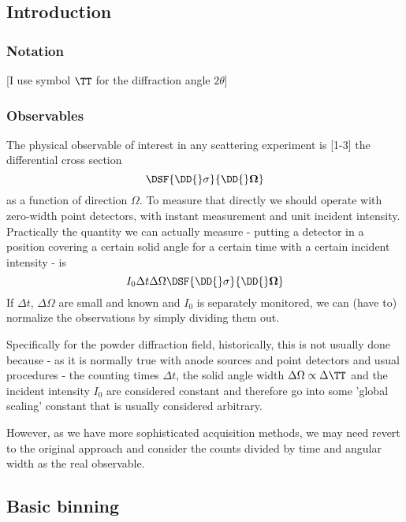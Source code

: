 

\subsection{Introduction}
\subsubsection{Notation}

[I use symbol $\TT$ for the diffraction angle $2\theta$]

\subsubsection{Observables}
The physical observable of interest in any scattering experiment is [1-3] the differential cross section
\[
\DSF{\DD{}\bf{\sigma}}{\DD{}\Omega}
\]
as a function of direction $\Omega$. 
To measure that directly we should operate with zero-width point detectors, with instant measurement and unit incident intensity. 
Practically 
the quantity we can actually measure - putting a detector in a position covering a certain 
solid angle for a certain time with a certain incident intensity - is
\[
{I_0}\Delta t \Delta\Omega\DSF{\DD{}\bf{\sigma}}{\DD{}\Omega}
\]
If $\Delta t$, $\Delta\Omega$ are small and known and $I_0$ is separately monitored, 
we can (have to) normalize the observations by simply dividing them out. 

Specifically for the powder diffraction field, historically, this is not usually done because
- as it is normally true with anode sources and point detectors and usual procedures - 
the counting times $\Delta t$, the solid angle width $\Delta\Omega\propto \Delta \TT$ 
and the incident intensity $I_0$ are considered 
constant and therefore go into some 'global scaling' constant that is usually considered arbitrary. 

However, as we have more sophisticated acquisition methods, 
we may need revert to the original approach and consider the 
counts divided by time and angular width as the real observable.

\subsection{Basic binning}\label{sec:11}

